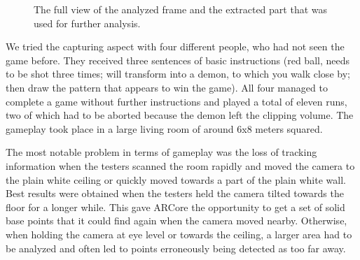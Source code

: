 \begin{figure}[htpb]
  \centering
  \quad
  \caption{The full view of the analyzed frame and the extracted part that was used for further analysis.}\label{fig:example-frame}
\end{figure}

We tried the capturing aspect with four different people, who had not seen the game before. They received three sentences of basic instructions (red ball, needs to be shot three times; will transform into a demon, to which you walk close by; then draw the pattern that appears to win the game). All four managed to complete a game without further instructions and played a total of eleven runs, two of which had to be aborted because the demon left the clipping volume. The gameplay took place in a large living room of around 6x8 meters squared.

The most notable problem in terms of gameplay was the loss of tracking information when the testers scanned the room rapidly and moved the camera to the plain white ceiling or quickly moved towards a part of the plain white wall. Best results were obtained when the testers held the camera tilted towards the floor for a longer while. This gave ARCore the opportunity to get a set of solid base points that it could find again when the camera moved nearby. Otherwise, when holding the camera at eye level or towards the ceiling, a larger area had to be analyzed and often led to points erroneously being detected as too far away.

